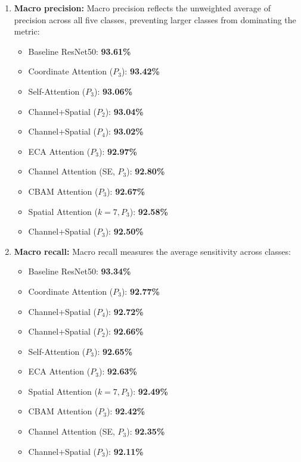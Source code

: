 \documentclass[10pt]{article}
\begin{document}
\begin{enumerate}
\item \textbf{Macro precision:}
Macro precision reflects the unweighted average of precision across all five classes, preventing larger classes from dominating the metric:
\begin{itemize}
\item Baseline ResNet50: \textbf{93.61\%}
\item Coordinate Attention ($P_3$): \textbf{93.42\%}
\item Self-Attention ($P_3$): \textbf{93.06\%}
\item Channel+Spatial ($P_2$): \textbf{93.04\%}
\item Channel+Spatial ($P_4$): \textbf{93.02\%}
\item ECA Attention ($P_3$): \textbf{92.97\%}
\item Channel Attention (SE, $P_3$): \textbf{92.80\%}
\item CBAM Attention ($P_3$): \textbf{92.67\%}
\item Spatial Attention ($k=7, P_3$): \textbf{92.58\%}
\item Channel+Spatial ($P_3$): \textbf{92.50\%}
\end{itemize}

\item \textbf{Macro recall:}
Macro recall measures the average sensitivity across classes:
\begin{itemize}
\item Baseline ResNet50: \textbf{93.34\%}
\item Coordinate Attention ($P_3$): \textbf{92.77\%}
\item Channel+Spatial ($P_4$): \textbf{92.72\%}
\item Channel+Spatial ($P_2$): \textbf{92.66\%}
\item Self-Attention ($P_3$): \textbf{92.65\%}
\item ECA Attention ($P_3$): \textbf{92.63\%}
\item Spatial Attention ($k=7, P_3$): \textbf{92.49\%}
\item CBAM Attention ($P_3$): \textbf{92.42\%}
\item Channel Attention (SE, $P_3$): \textbf{92.35\%}
\item Channel+Spatial ($P_3$): \textbf{92.11\%}
\end{itemize}


\end{enumerate}
\end{document}
